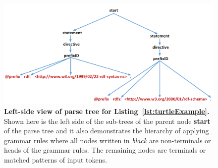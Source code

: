 \begin{figure}
		\centering\includegraphics[width=1\linewidth]{images/implementationParseTreeLeft.png}
		\caption{\textbf{Left-side view of parse tree for Listing~\ref{lst:turtleExample}.} Shown here is the left side  of the sub-trees of the parent node \textbf{start} of the parse tree and it also demonstrates the hierarchy of applying grammar rules where all nodes written in \emph{black} are non-terminals or heads of the grammar rules. The remaining nodes are terminals or matched patterns of input tokens.}
	\label{Fig:implementationParseTreeLeft}
\end{figure}



